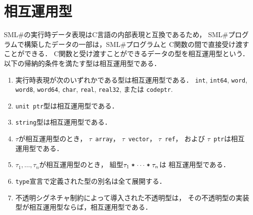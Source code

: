\documentclass{jbook}
\newcommand{\smlsharp}{SML\#}
\begin{document}
\section{相互運用型}

	\smlsharp{}の実行時データ表現はC言語の内部表現と互換であるため，
\smlsharp{}プログラムで構築したデータの一部は，\smlsharp{}プログラムと
C関数の間で直接受け渡すことができる．
	C関数と受け渡すことができるデータの型を相互運用型という．
	以下の帰納的条件を満たす型は相互運用型である．
\begin{enumerate}
\item
	実行時表現が次のいずれかである型は相互運用型である．
{\tt int},
{\tt int64},
{\tt word},
{\tt word8},
{\tt word64},
{\tt char},
{\tt real},
{\tt real32}, または
{\tt codeptr}.
\item
	{\tt unit ptr}型は相互運用型である．
\item
	{\tt string}型は相互運用型である．
\item
	$\tau$が相互運用型のとき，
{\tt $\tau$ array}，
{\tt $\tau$ vector}，
{\tt $\tau$ ref}，
および
{\tt $\tau$ ptr}は相互運用型である．
\item
	$\tau_1, \ldots, \tau_n$が相互運用型のとき，
組型$\tau_1\mathrel{\mbox{\tt *}}\cdots\mathrel{\mbox{\tt *}}\tau_n$は
相互運用型である．
\item
	{\tt type}宣言で定義された型の別名は全て展開する．
\item
	不透明シグネチャ制約によって導入された不透明型は，
その不透明型の実装型が相互運用型ならば，相互運用型である．
\end{enumerate}
\end{document}
